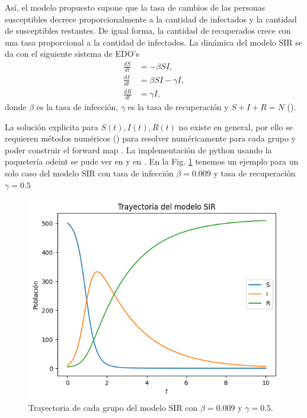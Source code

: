 Así, el modelo propuesto supone que la tasa de cambios de las personas susceptibles decrece proporcionalmente a la cantidad de infectados y la cantidad de susceptibles restantes. De igual forma, la cantidad de recuperados crece con una tasa proporcional a la cantidad de infectados. La dinámica del modelo SIR se da con el siguiente sistema de EDO's
\begin{align}
    \frac{dS}{dt} &= -\beta S I, \nonumber \\
    \frac{dI}{dt} &= \beta S I - \gamma I,
    \label{3.1.3.01} \\
    \frac{dR}{dt} &= \gamma I, \nonumber
\end{align}
donde $\beta$ es la tasa de infección, $\gamma$ es la tasa de recuperación y $S + I + R = N$ (\cite{weiss2013sir}).

La solución explicita para $S(t), I(t), R(t)$ no existe en general, por ello se requieren métodos numéricos (\cite{mathews2000metodos}) para resolver numéricamente para cada grupo y poder construir el forward map . La implementación de python usando la paquetería odeint se pude ver en \cite{jimenez2022metodos} y en \cite{griffiths2010numerical}. En la Fig. \ref{fig:trayectoria_SIR} tenemos un ejemplo para un solo caso del modelo SIR con tasa de infección $\beta = 0.009$ y tasa de recuperación $\gamma = 0.5$


\begin{figure}
    \centering
    \includegraphics[width = 10 cm]{img/trayectoria_SIR.png}
    \caption{Trayectoria de cada grupo del modelo SIR con $\beta = 0.009$ y $\gamma = 0.5$.}
    \label{fig:trayectoria_SIR}
\end{figure}




